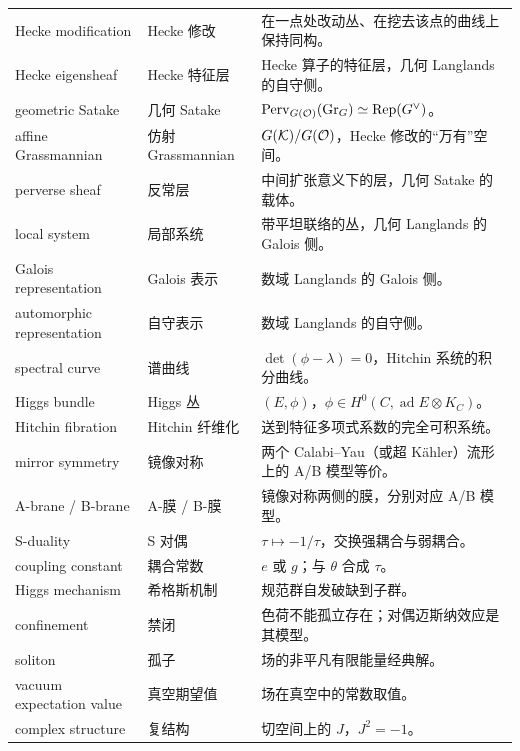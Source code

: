 {\begin{longtable}{@{}p{4.3cm}p{3.3cm}p{6.6cm}@{}}
Hecke modification & Hecke 修改 & 在一点处改动丛、在挖去该点的曲线上保持同构。 \\
Hecke eigensheaf & Hecke 特征层 & Hecke 算子的特征层，几何 Langlands 的自守侧。 \\
geometric Satake & 几何 Satake & $\mathrm{Perv}_{G(\mathcal{O})}(\mathrm{Gr}_G)\simeq\operatorname{Rep}(G^{\vee})$。 \\
affine Grassmannian & 仿射 Grassmannian & $G(\mathcal{K})/G(\mathcal{O})$，Hecke 修改的“万有”空间。 \\
perverse sheaf & 反常层 & 中间扩张意义下的层，几何 Satake 的载体。 \\
local system & 局部系统 & 带平坦联络的丛，几何 Langlands 的 Galois 侧。 \\
Galois representation & Galois 表示 & 数域 Langlands 的 Galois 侧。 \\
automorphic representation & 自守表示 & 数域 Langlands 的自守侧。 \\
spectral curve & 谱曲线 & $\det(\phi-\lambda)=0$，Hitchin 系统的积分曲线。 \\
Higgs bundle & Higgs 丛 & $(E,\phi)$，$\phi\in H^0(C,\operatorname{ad}E\otimes K_C)$。 \\
Hitchin fibration & Hitchin 纤维化 & 送到特征多项式系数的完全可积系统。 \\
mirror symmetry & 镜像对称 & 两个 Calabi--Yau（或超 Kähler）流形上的 A/B 模型等价。 \\
A-brane / B-brane & A-膜 / B-膜 & 镜像对称两侧的膜，分别对应 A/B 模型。 \\
S-duality & S 对偶 & $\tau\mapsto-1/\tau$，交换强耦合与弱耦合。 \\
coupling constant & 耦合常数 & $e$ 或 $g$；与 $\theta$ 合成 $\tau$。 \\
Higgs mechanism & 希格斯机制 & 规范群自发破缺到子群。 \\
confinement & 禁闭 & 色荷不能孤立存在；对偶迈斯纳效应是其模型。 \\
soliton & 孤子 & 场的非平凡有限能量经典解。 \\
vacuum expectation value & 真空期望值 & 场在真空中的常数取值。 \\
complex structure & 复结构 & 切空间上的 $J$，$J^2=-1$。 \\
\end{longtable}
}

